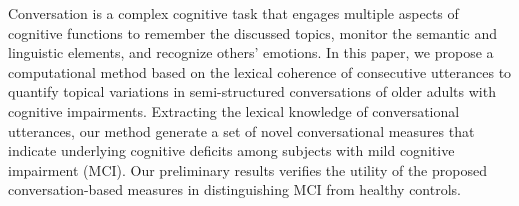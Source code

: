 Conversation is a complex cognitive task that engages multiple aspects of cognitive functions to remember the discussed topics, monitor the semantic and linguistic elements, and recognize others' emotions. In this paper, we propose a computational method based on the lexical coherence of consecutive utterances to quantify topical variations  in semi-structured conversations of older adults with  cognitive impairments. Extracting the lexical knowledge of conversational utterances, our method  generate a set of novel conversational measures that indicate underlying cognitive deficits among subjects with mild cognitive impairment (MCI). Our preliminary results verifies the utility of the proposed conversation-based measures in distinguishing MCI from healthy controls.
